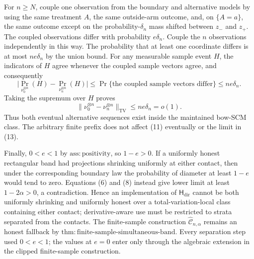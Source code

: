 For \(n\ge N\), couple one observation from the boundary and alternative models by using the same treatment \(A\), the same outside-arm outcome, and, on \(\{A=a\}\), the same outcome except on the probability-\(\delta_n\) mass shifted between \(z_-\) and \(z_+\). The coupled observations differ with probability \(e\delta_n\). Couple the \(n\) observations independently in this way. The probability that at least one coordinate differs is at most \(ne\delta_n\) by the union bound. For any measurable sample event \(H\), the indicators of \(H\) agree whenever the coupled sample vectors agree, and consequently
\[
 \bigl|\Pr_{\nu_0^{\otimes n}}(H)-\Pr_{\nu_n^{\otimes n}}(H)\bigr|
 \le \Pr\{\text{the coupled sample vectors differ}\}
 \le ne\delta_n.
\]
Taking the supremum over \(H\) proves
\[
 \lVert\nu_0^{\otimes n}-\nu_n^{\otimes n}\rVert_{\mathrm{TV}}
 \le ne\delta_n=o(1).
 \tag{13}
\]
Thus both eventual alternative sequences exist inside the maintained bow-SCM class. The arbitrary finite prefix does not affect (11) eventually or the limit in (13).

Finally, \(0<e<1\) by \(\mathrm{ass:positivity}\), so \(1-e>0\). If a uniformly honest rectangular band had projections shrinking uniformly at either contact, then under the corresponding boundary law the probability of diameter at least \(1-e\) would tend to zero. Equations (6) and (8) instead give lower limit at least \(1-2\alpha>0\), a contradiction. Hence an implementation of \(\mathsf H_{\mathrm{dir}}\) cannot be both uniformly shrinking and uniformly honest over a total-variation-local class containing either contact; derivative-aware use must be restricted to strata separated from the contacts. The finite-sample construction \(\widehat{\mathcal C}_{n,\alpha}\) remains an honest fallback by \(\mathrm{thm:finite\text{-}sample\text{-}simultaneous\text{-}band}\). Every separation step used \(0<e<1\); the values at \(e=0\) enter only through the algebraic extension in the clipped finite-sample construction.